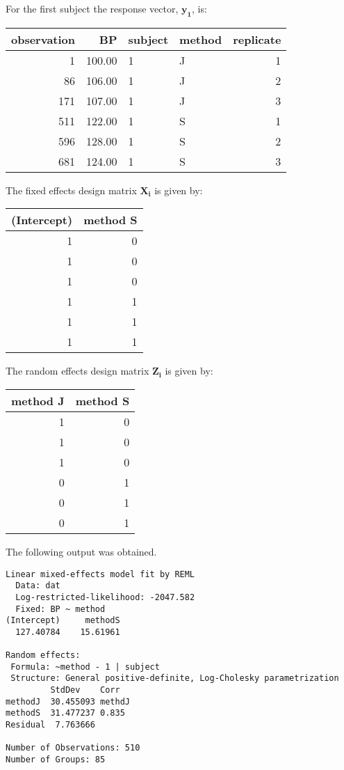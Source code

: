 \documentclass[12pt, a4paper]{article}
\begin{document}
For the first subject the response vector, $\boldsymbol{y_{1}}$, is:
\begin{table}[ht]
\begin{center}
\begin{tabular}{rrllr}
  \hline
observation & BP & subject & method & replicate \\
  \hline
1 & 100.00 & 1 & J &   1 \\
  86 & 106.00 & 1 & J &   2 \\
  171 & 107.00 & 1 & J &   3 \\
  511 & 122.00 & 1 & S &   1 \\
  596 & 128.00 & 1 & S &   2 \\
  681 & 124.00 & 1 & S &   3 \\
   \hline
\end{tabular}
\end{center}
\end{table}
\newpage
The fixed effects design matrix $\boldsymbol{X_{i}}$ is given by:
\begin{table}[ht]
\begin{center}
\begin{tabular}{r|r}
  \hline
  (Intercept) & method S \\
  \hline
 1 & 0 \\
 1 & 0 \\
 1 & 0 \\
 1 & 1 \\
 1 & 1 \\
 1 & 1 \\
   \hline
\end{tabular}
\end{center}
\end{table}

The random effects design matrix $\boldsymbol{Z_{i}}$ is given by:
\begin{table}[ht]
\begin{center}
\begin{tabular}{r|r}
  \hline
 method J & method S \\
  \hline
 1 & 0 \\
 1 & 0 \\
 1 & 0 \\
 0 & 1 \\
 0 & 1 \\
 0 & 1 \\
   \hline
\end{tabular}
\end{center}
\end{table}
\newpage
The following output was obtained.
\begin{verbatim}
Linear mixed-effects model fit by REML
  Data: dat
  Log-restricted-likelihood: -2047.582
  Fixed: BP ~ method
(Intercept)     methodS
  127.40784    15.61961

Random effects:
 Formula: ~method - 1 | subject
 Structure: General positive-definite, Log-Cholesky parametrization
         StdDev    Corr
methodJ  30.455093 methdJ
methodS  31.477237 0.835
Residual  7.763666

Number of Observations: 510
Number of Groups: 85

\end{verbatim}
\newpage
{}


\end{document}
